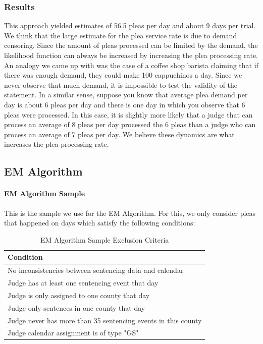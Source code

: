 \documentclass[11pt, oneside]{article}   	%
\theoremstyle{ModifiedStyle}
\begin{document}
		\subsubsection{Results}
		  This approach yielded estimates of 56.5 pleas per day and about 9 days per trial. We think that the large estimate for the plea service rate is due to demand censoring. Since the amount of pleas processed can be limited by the demand, the likelihood function can always be increased by increasing the plea processing rate. An analogy we came up with was the case of a coffee shop barista claiming that if there was enough demand, they could make 100 cappuchinos a day. Since we never observe that much demand, it is impossible to test the validity of the statement. In a similar sense, suppose you know that average plea demand per day is about 6 pleas per day and there is one day in which you observe that 6 pleas were processed. In this case, it is slightly more likely that a judge that can process an average of 8 pleas per day processed the 6 pleas than a judge who can process an average of 7 pleas per day. We believe these dynamics are what increases the plea processing rate.

	\subsection{EM Algorithm}
		\paragraph{EM Algorithm Sample} This is the sample we use for the EM Algorithm. For this, we only consider pleas that happened on days which satisfy the following conditions:
			\begin{table}[H]
				\centering
				\caption{EM Algorithm Sample Exclusion Criteria}
				\begin{tabular}{|l|}
				\hline
				\textbf{Condition}                                                  \\ \hline
				No inconsistencies between sentencing data and calendar \\ \hline
				Judge has at least one sentencing event that day         \\ \hline
				Judge is only assigned to one county that day          \\ \hline
				Judge only sentences in one county that day             \\ \hline
				Judge never has more than 35 sentencing events in this county \\ \hline
				Judge calendar assignment is of type "GS"           \\ \hline
				\end{tabular}
			\end{table}
\end{document}
